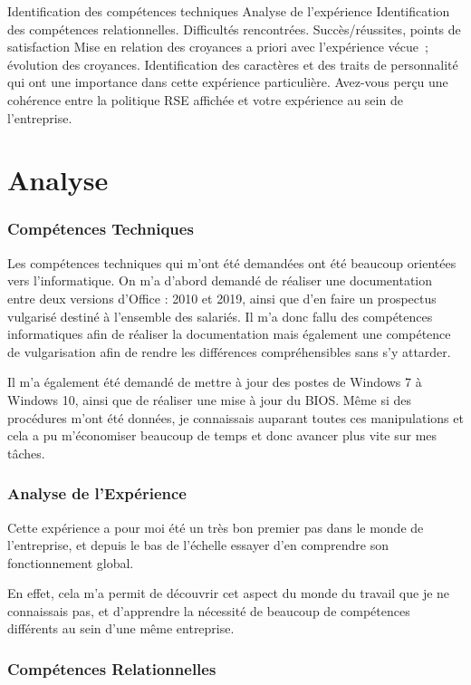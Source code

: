 


Identification des compétences techniques
Analyse de l’expérience 
Identification des compétences relationnelles.
Difficultés rencontrées.
Succès/réussites, points de satisfaction
Mise en relation des croyances a priori avec l’expérience vécue ; évolution des croyances.
Identification des caractères et des traits de personnalité qui ont une importance dans cette expérience particulière.
Avez-vous perçu une cohérence entre la politique RSE affichée et votre expérience au sein de l’entreprise. 

\section{Analyse}


\subsubsection*{Compétences Techniques}

Les compétences techniques qui m'ont été demandées ont été beaucoup orientées vers l'informatique.
On m'a d'abord demandé de réaliser une documentation entre deux versions d'Office : 2010 et 2019, ainsi que d'en faire un prospectus vulgarisé destiné à l'ensemble des salariés.
Il m'a donc fallu des compétences informatiques afin de réaliser la documentation mais également une compétence de vulgarisation afin de rendre les différences compréhensibles sans s'y attarder.

Il m'a également été demandé de mettre à jour des postes de Windows 7 à Windows 10, ainsi que de réaliser une mise à jour du BIOS.
Même si des procédures m'ont été données, je connaissais auparant toutes ces manipulations et cela a pu m'économiser beaucoup de temps et donc avancer plus vite sur mes tâches.

\subsubsection*{Analyse de l'Expérience}

Cette expérience a pour moi été un très bon premier pas dans le monde de l'entreprise, et depuis le bas de l'échelle essayer d'en comprendre son fonctionnement global.

En effet, cela m'a permit de découvrir cet aspect du monde du travail que je ne connaissais pas, et d'apprendre la nécessité de beaucoup de compétences différents au sein d'une même entreprise.


\subsubsection*{Compétences Relationnelles}

